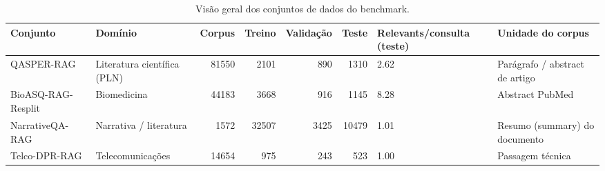 \begin{table}
\caption{Visão geral dos conjuntos de dados do benchmark.}
\label{tab:tabela_resumo_capitulo}
\begin{tabular}{llrrrrll}
\toprule
Conjunto & Domínio & Corpus & Treino & Validação & Teste & Relevants/consulta (teste) & Unidade do corpus \\
\midrule
QASPER-RAG & Literatura científica (PLN) & 81550 & 2101 & 890 & 1310 & 2.62 & Parágrafo / abstract de artigo \\
BioASQ-RAG-Resplit & Biomedicina & 44183 & 3668 & 916 & 1145 & 8.28 & Abstract PubMed \\
NarrativeQA-RAG & Narrativa / literatura & 1572 & 32507 & 3425 & 10479 & 1.01 & Resumo (summary) do documento \\
Telco-DPR-RAG & Telecomunicações & 14654 & 975 & 243 & 523 & 1.00 & Passagem técnica \\
\bottomrule
\end{tabular}
\end{table}
